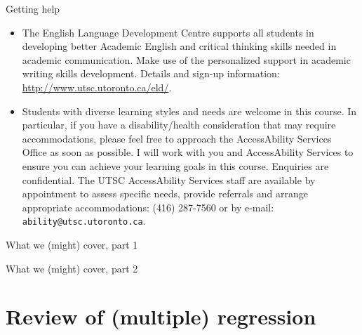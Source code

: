 \documentclass[unknownkeysallowed]{beamer}\usepackage[]{graphicx}\usepackage[]{color}
\begin{document}
\begin{frame}[fragile]{Getting help}

  \begin{itemize}
  \item The English Language Development Centre supports all students
    in developing better Academic English and critical thinking skills
    needed in academic communication. Make use of the personalized
    support in academic writing skills development. Details and sign-up information:
    \url{http://www.utsc.utoronto.ca/eld/}.
  \item      Students with diverse learning styles and needs are welcome in this
course. In particular, if you have a disability/health consideration
that may require accommodations, please feel free to approach the AccessAbility Services Office as soon as possible. I will
work with you and AccessAbility Services to ensure you can achieve
your learning goals in this course. Enquiries are confidential. The
UTSC AccessAbility Services staff are available by
appointment to assess specific needs, provide referrals and arrange
appropriate accommodations: (416) 287-7560 or by e-mail: \texttt{ability@utsc.utoronto.ca}.


  \end{itemize}
  
\end{frame}


\begin{frame}{What we (might) cover, part 1}
  \tableofcontents[sections={1-10}]  %
\end{frame}

\begin{frame}{What we (might) cover, part 2}
  \tableofcontents[sections={11-}]  %
\end{frame}




\section{Review of (multiple) regression}
\frame{\sectionpage}

\end{document}
